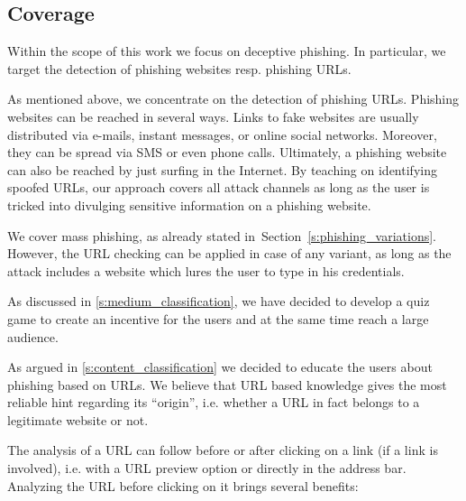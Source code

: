 \subsection{Coverage}
\label{s:coverage}
\begin{description}[leftmargin=0cm]
	\item[Deceptive Phishing as Phishing Technique] Within the scope of this work we focus on deceptive phishing.
 In particular, we target the detection of phishing websites resp. phishing URLs.
 
	\item[Several Attack Channels] As mentioned above, we concentrate on the detection of phishing URLs.
 Phishing websites can be reached in several ways.
 Links to fake websites are usually distributed via e-mails, instant messages, or online social networks.
 Moreover, they can be spread via SMS or even phone calls.
 Ultimately, a phishing website can also be reached by just surfing in the Internet.
 By teaching on identifying spoofed URLs, our approach covers all attack channels as long as the user is tricked into divulging sensitive information on a phishing website.

	\item[Mass Phishing as Variation of Phishing] We cover mass phishing, as already stated in~Section~\autoref{s:phishing_variations}.
 However, the URL checking can be applied in case of any variant, as long as the attack includes a website which lures the user to type in his credentials.

	\item[Game and Quiz Based Learning as Communication Medium] As discussed in \autoref{s:medium_classification}, we have decided to develop a quiz game to create an incentive for the users and at the same time reach a large audience. 

	\item[URL Based Knowledge as Learning Content] As argued in \autoref{s:content_classification} we decided to educate the users about phishing based on URLs. 
We believe that URL based knowledge gives the most reliable hint regarding its ``origin'', i.e. whether a URL in fact belongs to a legitimate website or not.

	\item[After Click URL Analysis] The analysis of a URL can follow before or after clicking on a link (if a link is involved), i.e. with a URL preview option or directly in the address bar. 
Analyzing the URL before clicking on it brings several benefits:


\end{description}
